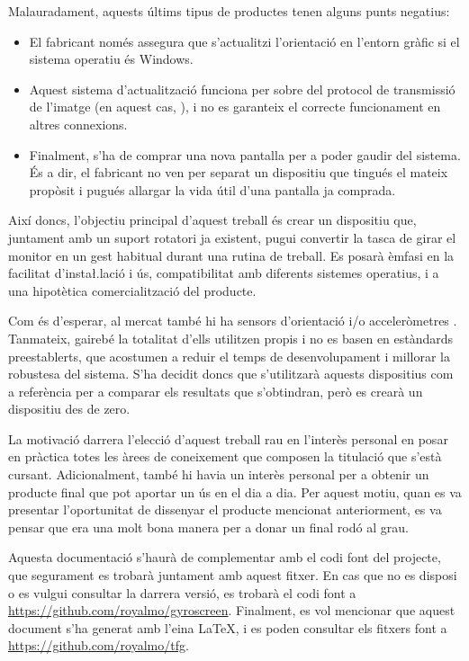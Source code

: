 Malauradament, aquests últims tipus de productes tenen alguns punts negatius:
\begin{itemize}
    \item El fabricant només assegura que s'actualitzi l'orientació en l'entorn
    gràfic si el sistema operatiu és Windows.
    \item Aquest sistema d'actualització funciona per sobre del protocol de
    transmissió de l'imatge (en aquest cas, ), i no es garanteix el correcte
    funcionament en altres connexions.
    \item Finalment, s'ha de comprar una nova pantalla per a poder gaudir del
    sistema. És a dir, el fabricant no ven per separat un dispositiu que tingués
    el mateix propòsit i pugués allargar la vida útil d'una pantalla ja
    comprada.
\end{itemize}

Així doncs, l'objectiu principal d'aquest treball és crear un dispositiu que,
juntament amb un suport rotatori ja existent, pugui convertir la tasca de girar
el monitor en un gest habitual durant una rutina de treball. Es posarà èmfasi en
la facilitat d'insta\l.lació i ús, compatibilitat amb diferents sistemes
operatius, i a una hipotètica comercialització del producte.

Com és d'esperar, al mercat també hi ha sensors d'orientació i/o acceleròmetres
 \cite{Yocto3D}. Tanmateix, gairebé la totalitat d'ells utilitzen
 propis i no es basen en estàndards preestablerts, que acostumen
a reduir el temps de desenvolupament i millorar la robustesa del sistema. S'ha
decidit doncs que s'utilitzarà aquests dispositius com a referència per a
comparar els resultats que s'obtindran, però es crearà un dispositiu des de zero.

La motivació darrera l'elecció d'aquest treball rau en l'interès personal en
posar en pràctica totes les àrees de coneixement que composen la titulació que
s'està cursant. Adicionalment, també hi havia un interès personal per a obtenir
un producte final que pot aportar un ús en el dia a dia. Per aquest motiu, quan
es va presentar l'oportunitat de dissenyar el producte mencionat anteriorment,
es va pensar que era una molt bona manera per a donar un final rodó al grau.

Aquesta documentació s'haurà de complementar amb el codi font del projecte, que
segurament es trobarà juntament amb aquest fitxer. En cas que no es disposi o
es vulgui consultar la darrera versió, es trobarà el codi font a
\url{https://github.com/royalmo/gyroscreen}.
Finalment, es vol mencionar que aquest document s'ha generat amb l'eina \LaTeX,
i es poden consultar els fitxers font a \url{https://github.com/royalmo/tfg}.
